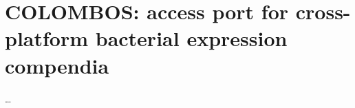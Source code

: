 \chapter{COLOMBOS: access port for cross-platform bacterial expression compendia}\label{ch:colombos}

\ldots

\instructionsintroduction

%
%
%


